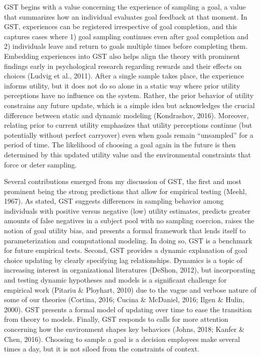 \documentclass[english,man]{apa6}
\theoremstyle{definition}
\theoremstyle{definition}
\theoremstyle{definition}
\theoremstyle{remark}
\begin{document}
GST begins with a value concerning the experience of sampling a goal, a
value that summarizes how an individual evaluates goal feedback at that
moment. In GST, experiences can be registered irrespective of goal
completion, and this captures cases where 1) goal sampling continues
even after goal completion and 2) individuals leave and return to goals
multiple times before completing them. Embedding experiences into GST
also helps align the theory with prominent findings early in
psychological research regarding rewards and their effects on choices
(Ludvig et al., 2011). After a single sample takes place, the experience
informs utility, but it does not do so alone in a static way where prior
utility perceptions have no influence on the system. Rather, the prior
behavior of utility constrains any future update, which is a simple idea
but acknowledges the crucial difference between static and dynamic
modeling (Kondrashov, 2016). Moreover, relating prior to current utility
emphasizes that utility perceptions continue (but potentially without
perfect carryover) even when goals remain \enquote{unsampled} for a
period of time. The likelihood of choosing a goal again in the future is
then determined by this updated utility value and the environmental
constraints that force or deter sampling.

Several contributions emerged from my discussion of GST, the first and
most prominent being the strong predictions that allow for empirical
testing (Meehl, 1967). As stated, GST suggests differences in sampling
behavior among individuals with positive versus negative (low) utility
estimates, predicts greater amounts of false negatives in a subject pool
with no sampling coercion, raises the notion of goal utility bias, and
presents a formal framework that lends itself to parameterization and
computational modeling. In doing so, GST is a benchmark for future
empirical tests. Second, GST provides a dynamic explanation of goal
choice updating by clearly specifying lag relationships. Dynamics is a
topic of increasing interest in organizational literatures (DeShon,
2012), but incorporating and testing dynamic hypotheses and models is a
significant challenge for empirical work (Pitariu \& Ployhart, 2010) due
to the vague and verbose nature of some of our theories (Cortina, 2016;
Cucina \& McDaniel, 2016; Ilgen \& Hulin, 2000). GST presents a formal
model of updating over time to ease the transition from theory to
models. Finally, GST responds to calls for more attention concerning how
the environment shapes key behaviors (Johns, 2018; Kanfer \& Chen,
2016). Choosing to sample a goal is a decision employees make several
times a day, but it is not siloed from the constraints of context.
\end{document}
